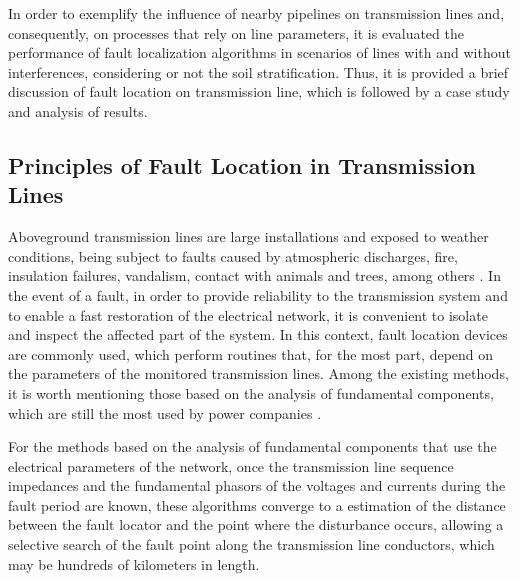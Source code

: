 \documentclass[conference]{IEEEtran}
\begin{document}
In order to exemplify the influence of nearby pipelines on transmission lines and, consequently, on processes that rely on line parameters, it is evaluated the performance of fault localization algorithms in scenarios of lines with and without interferences, considering or not the soil stratification. Thus, it is provided a brief discussion of fault location on transmission line, which is followed by a case study and analysis of results.


\subsection{Principles of Fault Location in Transmission Lines}
Aboveground transmission lines are large installations and exposed to weather conditions, being subject to faults caused by atmospheric discharges, fire, insulation failures, vandalism, contact with animals and trees, among others \cite{Das2014}. In the event of a fault, in order to provide reliability to the transmission system and to enable a fast restoration of the electrical network, it is convenient to isolate and inspect the affected part of the system. In this context, fault location devices are commonly used, which perform routines that, for the most part, depend on the parameters of the monitored transmission lines. Among the existing methods, it is worth mentioning those based on the analysis of fundamental components, which are still the most used by power companies \cite{Das2014}.

For the methods based on the analysis of fundamental components that use the electrical parameters of the network, once the transmission line sequence impedances and the fundamental phasors of the voltages and currents during the fault period are known, these algorithms converge to a estimation of the distance between the fault locator and the point where the disturbance occurs, allowing a selective search of the fault point along the transmission line conductors, which may be hundreds of kilometers in length.
\end{document}
